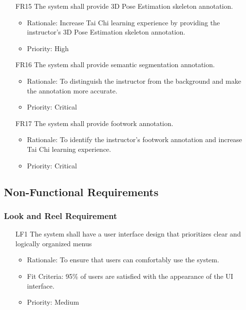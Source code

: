 \documentclass[12pt]{article}
\begin{document}
\begin{itemize}
\color{red}
    \item[FR15] The system shall provide 3D Pose Estimation skeleton annotation.  \label{FR15}
    \begin{itemize}
        \item Rationale: Increase Tai Chi learning experience by providing the instructor's 3D Pose Estimation skeleton annotation.
        \item Priority: High
    \end{itemize}
\end{itemize}
\begin{itemize}
\color{red}
    \item[FR16] The system shall provide semantic segmentation annotation.  \label{FR16}
    \begin{itemize}
        \item Rationale: To distinguish the instructor from the background and make the annotation more accurate.
        \item Priority: Critical
    \end{itemize}
\end{itemize}
\begin{itemize}
    \color{red}
        \item[FR17] The system shall provide footwork annotation.  \label{FR17}
        \begin{itemize}
            \item Rationale: To identify the instructor's footwork annotation and increase Tai Chi learning experience.
            \item Priority: Critical
        \end{itemize}
    \end{itemize}
\subsection{Non-Functional Requirements}

\subsubsection{Look and Reel Requirement}
\begin{itemize}
    \item[LF1] The system shall have a user interface design that prioritizes clear and logically organized menus \label{LF1}
    \begin{itemize}
        \item Rationale: To ensure that users can comfortably use the system.
        \item Fit Criteria: 95\% of users are satisfied with the appearance of the UI interface.
        \item Priority: Medium
    \end{itemize}
\end{itemize}
\end{document}
